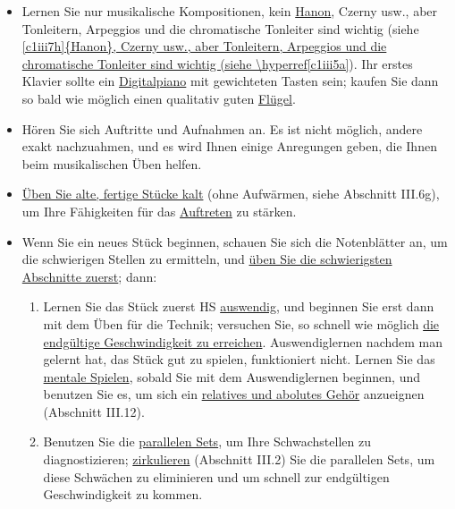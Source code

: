 \begin{itemize} 
\item Lernen Sie nur musikalische Kompositionen, kein \hyperref[c1iii7h]{Hanon}, Czerny usw., aber Tonleitern, Arpeggios und die chromatische Tonleiter sind wichtig (siehe \hyperref[c1iii5a]{\autoref{c1iii7h]{Hanon}, Czerny usw., aber Tonleitern, Arpeggios und die chromatische Tonleiter sind wichtig (siehe \hyperref[c1iii5a}}).
Ihr erstes Klavier sollte ein \hyperref[c1iii17b]{Digitalpiano} mit gewichteten Tasten sein; kaufen Sie dann so bald wie möglich einen qualitativ guten \hyperref[c1iii17d]{Flügel}.

\item Hören Sie sich Auftritte und Aufnahmen an.
Es ist nicht möglich, andere exakt nachzuahmen, und es wird Ihnen einige Anregungen geben, die Ihnen beim musikalischen Üben helfen.

\item \hyperref[c1iii6g]{Üben Sie alte, fertige Stücke kalt} (ohne Aufwärmen, siehe Abschnitt III.6g), um Ihre Fähigkeiten für das \hyperref[c1iii14]{Auftreten} zu stärken.

\item Wenn Sie ein neues Stück beginnen, schauen Sie sich die Notenblätter an, um die schwierigen Stellen zu ermitteln, und \hyperref[c1ii5]{üben Sie die schwierigsten Abschnitte zuerst}; dann:

 \begin{enumerate}[label={\alph*.}] 
 <li>Üben Sie \hyperref[c1ii7]{mit getrennten Händen} und mit sich überschneidenden Abschnitten (\hyperref[c1ii8]{Kontinuitätsregel}, Abschnitt II.8); wechseln Sie oft die Hände, wenn notwendig, alle fünf Sekunden.
Die gesamte technische Entwicklung sollte HS erfolgen.
 
 \item Lernen Sie das Stück zuerst HS \hyperref[c1iii6]{auswendig}, und beginnen Sie erst dann mit dem Üben für die Technik; versuchen Sie, so schnell wie möglich \hyperref[c1iii7i]{die endgültige Geschwindigkeit zu erreichen}.
Auswendiglernen nachdem man gelernt hat, das Stück gut zu spielen, funktioniert nicht.
Lernen Sie das \hyperref[c1ii12mental]{mentale Spielen}, sobald Sie mit dem Auswendiglernen beginnen, und benutzen Sie es, um sich ein \hyperref[c1iii12]{relatives und abolutes Gehör} anzueignen (Abschnitt III.12).
 
 \item Benutzen Sie die \hyperref[c1ii11]{parallelen Sets}, um Ihre Schwachstellen zu diagnostizieren; \hyperref[c1iii2]{zirkulieren} (Abschnitt III.2) Sie die parallelen Sets, um diese Schwächen zu eliminieren und um schnell zur endgültigen Geschwindigkeit zu kommen.
 

\end{enumerate}
\end{itemize}
